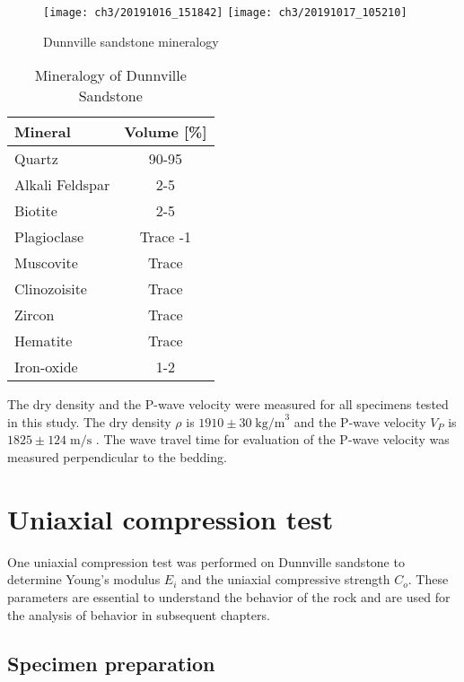 \begin{figure}[tb]
    \centering
    \texttt{[image: ch3/20191016\_151842]}
    \texttt{[image: ch3/20191017\_105210]}
    \caption{Dunnville sandstone mineralogy}
    \label{fig3:1}
\end{figure} 

\begin{table}[h]
    \centering
    \captionsetup{justification=centering}
    \caption{Mineralogy of Dunnville Sandstone \cite{Tarokh2016}}
    \begin{tabular}{lc} \hline
        Mineral & Volume [\%] \\ \hline \hline
        Quartz & 90-95 \\ 
        Alkali Feldspar & 2-5 \\ 
        Biotite & 2-5 \\ 
        Plagioclase & Trace -1 \\ 
        Muscovite & Trace \\ 
        Clinozoisite & Trace \\ 
        Zircon & Trace \\ 
        Hematite & Trace \\ 
        Iron-oxide & 1-2 \\ \hline
    \end{tabular}
    \label{tb3:mineralogy}
\end{table}

The dry density and the P-wave velocity  were measured for all specimens tested in this study. The dry density $\rho$ is $1910 \pm 30 \; \text{kg/m}^3$ and the P-wave velocity $V_P$ is $1825\pm 124 \; \text{m/s}$ . The wave travel time for evaluation of the P-wave velocity was measured perpendicular to the bedding.

\section{Uniaxial compression test}

One uniaxial compression test was performed on Dunnville sandstone to determine Young’s modulus $E_i$ and the uniaxial compressive strength $C_o$. These parameters are essential to understand the behavior of the rock and are used for the analysis of behavior in subsequent chapters.

\subsection{Specimen preparation}

